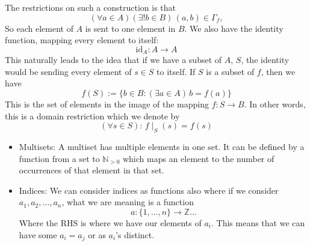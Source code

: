 \documentclass{report}
\begin{document}
The restrictions on such a construction is that
    \begin{equation*}
        (\forall a \in A)(\exists !b \in B) \, (a, b) \in \Gamma_{f},
    \end{equation*}
So each element of $A$ is sent to one element in $B$. We also have the identity function, mapping every element to itself:
    \begin{equation*}
        \text{id}_{A}: A \rightarrow A
    \end{equation*}
This naturally leads to the idea that if we have a subset of $A$, $S$, the identity would be sending every element of $s \in S$ to itself. If $S$ is a subset of $f$, then we have
    \begin{equation*}
        f(S) := \{b \in B : (\exists a \in A) \, b = f(a)\} 
    \end{equation*}
This is the set of elements in the image of the mapping $f : S \rightarrow B$. In other words, this is a domain restriction which we denote by
    \begin{equation*}
        (\forall s \in S) : \, f \mid_{S}(s) = f(s)
    \end{equation*}

\begin{examples}
    \begin{itemize}
        \item Multisets: A multiset has multiple elements in one set. It can be defined by a function from a set to $\mathbb{N}_{> 0}$ which maps an element to the number of occurrences of that element in that set.

        \item Indices: We can consider indices as functions also where if we consider $a_{1}, a_{2}, \ldots, a_{n}$, what we are meaning is a function 
            \begin{equation*}
                a : \{1, \ldots, n\} \rightarrow \mathbb{Z}\ldots
            \end{equation*}
            Where the RHS is where we have our elements of $a_{i}$. This means that we can have some $a_{i} = a_{j}$ or as $a_{i}$'s distinct.
    \end{itemize}
\end{examples}
\end{document}
